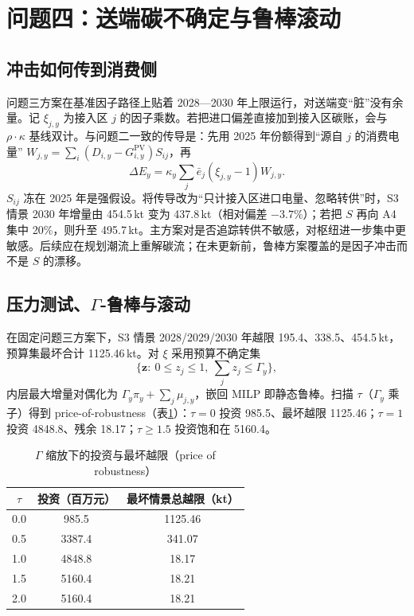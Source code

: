 \documentclass[UTF8,a4paper,zihao=-4,fontset=fandol]{ctexart}
\begin{document}
\section{问题四：送端碳不确定与鲁棒滚动}

\subsection{冲击如何传到消费侧}

问题三方案在基准因子路径上贴着 2028—2030 年上限运行，对送端变“脏”没有余量。记 $\xi_{j,y}$ 为接入区 $j$ 的因子乘数。若把进口偏差直接加到接入区碳账，会与 $\rho\cdot\kappa$ 基线双计。与问题二一致的传导是：先用 2025 年份额得到“源自 $j$ 的消费电量” $W_{j,y}=\sum_i(D_{i,y}-G^{\mathrm{PV}}_{i,y})S_{ij}$，再
\begin{equation}
\Delta E_y=\kappa_y\sum_j \bar e_j(\xi_{j,y}-1)W_{j,y}.
\label{eq:dE}
\end{equation}
$S_{ij}$ 冻在 2025 年是强假设。将传导改为“只计接入区进口电量、忽略转供”时，S3 情景 2030 年增量由 454.5\,kt 变为 437.8\,kt（相对偏差 $-3.7\%$）；若把 $S$ 再向 A4 集中 20\%，则升至 495.7\,kt。主方案对是否追踪转供不敏感，对枢纽进一步集中更敏感。后续应在规划潮流上重解碳流；在未更新前，鲁棒方案覆盖的是因子冲击而不是 $S$ 的漂移。

\subsection{\texorpdfstring{压力测试、$\Gamma$-鲁棒与滚动}{压力测试、鲁棒与滚动}}

在固定问题三方案下，S3 情景 2028/2029/2030 年越限 195.4、338.5、454.5\,kt，预算集最坏合计 1125.46\,kt。对 $\xi$ 采用预算不确定集\cite{Bertsimas2004price}
\begin{equation}
\bigl\{\boldsymbol z:\ 0\le z_j\le 1,\ \textstyle\sum_j z_j\le \Gamma_y\bigr\},
\label{eq:budgetset}
\end{equation}
内层最大增量对偶化为 $\Gamma_y\pi_y+\sum_j\mu_{j,y}$，嵌回 MILP 即静态鲁棒。扫描 $\tau$（$\Gamma_y$ 乘子）得到 price-of-robustness（表\ref{tab:gamma}）：$\tau=0$ 投资 985.5、最坏越限 1125.46；$\tau=1$ 投资 4848.8、残余 18.17；$\tau\ge 1.5$ 投资饱和在 5160.4。

\begin{table}[htbp]
\centering
\caption{$\Gamma$ 缩放下的投资与最坏越限（price of robustness）}
\label{tab:gamma}
\begin{tabular}{ccc}
\toprule
$\tau$ & 投资（百万元） & 最坏情景总越限（kt） \\
\midrule
0.0 & 985.5 & 1125.46 \\
0.5 & 3387.4 & 341.07 \\
1.0 & 4848.8 & 18.17 \\
1.5 & 5160.4 & 18.21 \\
2.0 & 5160.4 & 18.21 \\
\bottomrule
\end{tabular}
\end{table}
\end{document}

